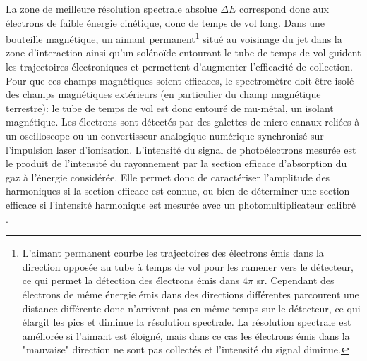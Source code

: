 La zone de meilleure résolution spectrale absolue $\Delta E$ correspond donc aux électrons de faible énergie cinétique, donc de temps de vol long. Dans une bouteille magnétique, un aimant permanent\footnote{L'aimant permanent courbe les trajectoires des électrons émis dans la direction opposée au tube à temps de vol pour les ramener vers le détecteur, ce qui permet la détection des électrons émis dans $4 \pi$ sr. Cependant des électrons de même énergie émis dans des directions différentes parcourent une distance différente donc n'arrivent pas en même temps sur le détecteur, ce qui élargit les pics et diminue la résolution spectrale. La résolution spectrale est améliorée si l'aimant est éloigné, mais dans ce cas les électrons émis dans la "mauvaise" direction ne sont pas collectés et l'intensité du signal diminue.} situé au voisinage du jet dans la zone d'interaction ainsi qu'un solénoïde entourant le tube de temps de vol guident les trajectoires électroniques et permettent d'augmenter l'efficacité de collection. Pour que ces champs magnétiques soient efficaces, le spectromètre doit être isolé des champs magnétiques extérieurs (en particulier du champ magnétique terrestre): le tube de temps de vol est donc entouré de mu-métal, un isolant magnétique. Les électrons sont détectés par des galettes de micro-canaux reliées à un oscilloscope ou un convertisseur analogique-numérique synchronisé sur l'impulsion laser d'ionisation. L'intensité du signal de photoélectrons mesurée est le produit de l'intensité du rayonnement par la section efficace d'absorption du gaz à l'énergie considérée. Elle permet donc de caractériser l'amplitude des harmoniques si la section efficace est connue, ou bien de déterminer une section efficace si l'intensité harmonique est mesurée avec un photomultiplicateur calibré .

